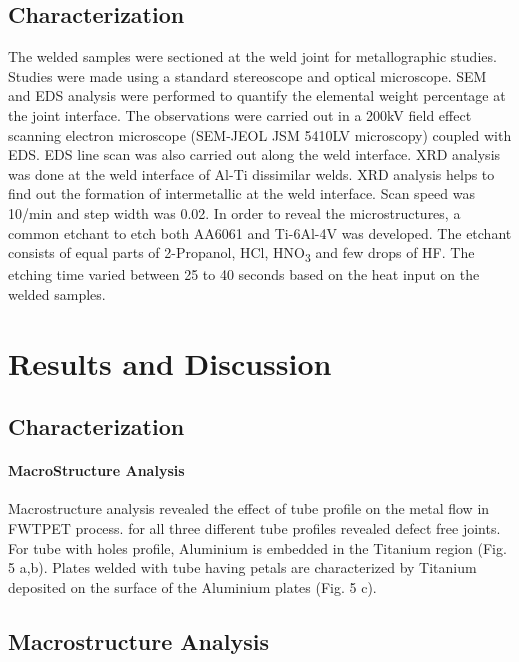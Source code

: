 \documentclass[3p]{elsarticle}
\begin{document}
\subsection{Characterization}
\label{subsec:Characterization}
The welded samples were sectioned at the weld joint for metallographic studies. Studies were made using a standard stereoscope and optical microscope. SEM and EDS analysis were performed to quantify the elemental weight percentage at the joint interface. The observations were carried out in a 200kV field effect scanning electron microscope (SEM-JEOL JSM 5410LV microscopy) coupled with EDS. EDS line scan was also carried out along the weld interface. XRD analysis was done at the weld interface of Al-Ti dissimilar welds. XRD analysis helps to find out the formation of intermetallic at the weld interface. Scan speed was 10\degree /min and step width was 0.02\degree . In order to reveal the microstructures, a common etchant to etch both AA6061 and Ti-6Al-4V was developed. The etchant consists of equal parts of 2-Propanol, HCl, HNO\textsubscript{3} and few drops of HF. The etching time varied between 25 to 40 seconds based on the heat input on the welded samples.

\section{Results and Discussion}
\label{sec:Results and Discussion}

\subsection{Characterization}
\label{subsec:Characterization}
\paragraph{MacroStructure Analysis}
Macrostructure analysis revealed the effect of tube profile on the metal flow in FWTPET process. for all three different tube profiles revealed defect free joints. For tube with holes profile, Aluminium is embedded in the Titanium region (Fig. 5 a,b). Plates welded with tube having petals are characterized by Titanium deposited on the surface of the Aluminium plates (Fig. 5 c).


\subsection{Macrostructure Analysis}
\label{subsec:Macrostructure Analysis}
\end{document}
